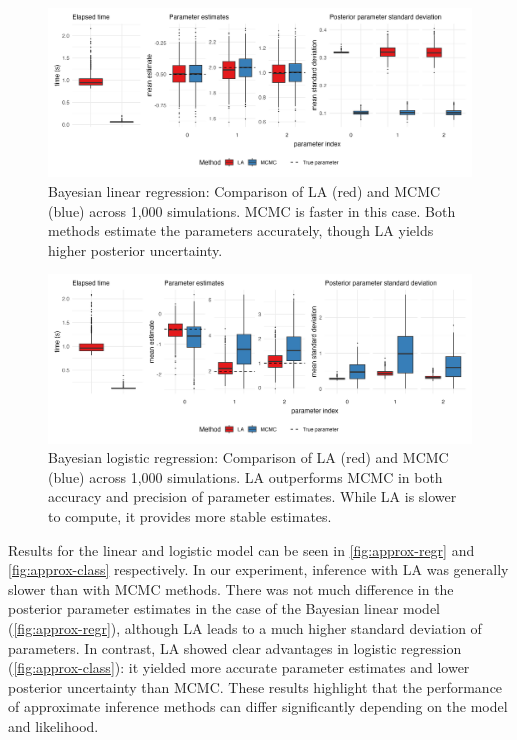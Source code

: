\begin{figure}[htbp]
    \centering
    \includegraphics[width=\linewidth]{../figures/approx_regr.png}
    \caption{
    Bayesian linear regression: Comparison of LA (red) and MCMC (blue) across 1,000 simulations.
    MCMC is faster in this case.
    Both methods estimate the parameters accurately, though LA yields higher posterior uncertainty.
    }
    \label{fig:approx-regr}
\end{figure}

\begin{figure}[htbp]
    \centering
    \includegraphics[width=\linewidth]{../figures/approx_class.png}
    \caption{
    Bayesian logistic regression: Comparison of LA (red) and MCMC (blue) across 1,000 simulations.
    LA outperforms MCMC in both accuracy and precision of parameter estimates.
    While LA is slower to compute, it provides more stable estimates.
    }
    \label{fig:approx-class}
\end{figure}

Results for the linear and logistic model can be seen in \autoref{fig:approx-regr} and \autoref{fig:approx-class} respectively.
In our experiment, inference with LA was generally slower than with MCMC methods.
There was not much difference in the posterior parameter estimates in the case of the Bayesian linear model (\autoref{fig:approx-regr}), although LA leads to a much higher standard deviation of parameters.
In contrast, LA showed clear advantages in logistic regression (\autoref{fig:approx-class}): it yielded more accurate parameter estimates and lower posterior uncertainty than MCMC.
These results highlight that the performance of approximate inference methods can differ significantly depending on the model and likelihood.


